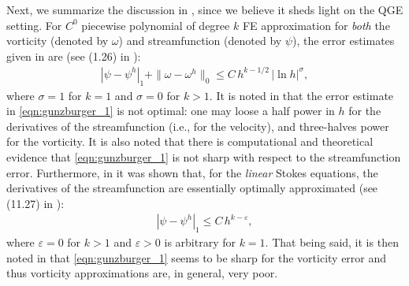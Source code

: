 Next, we summarize the discussion in \cite{Gunzburger89},
since we believe it sheds light on the QGE setting. For $C^0$ piecewise
polynomial of degree $k$ FE approximation for \emph{both} the vorticity
(denoted by $\omega$) and streamfunction (denoted by $\psi$), the error
estimates given in \cite{Girault86} are (see (1.26) in \cite{Gunzburger89}):
\begin{eqnarray}
  | \psi - \psi^h |_1 + \| \omega - \omega^h \|_0 \leq C \, h^{k - 1/2} \, | \ln h |^{\sigma} ,
  \label{eqn:gunzburger_1}
\end{eqnarray}
where $\sigma = 1$ for $k = 1$ and $\sigma = 0$ for $k > 1$. It is noted in
\cite{Gunzburger89} that the error estimate in \eqref{eqn:gunzburger_1} is not
optimal: one may loose a half power in $h$ for the derivatives of the
streamfunction (i.e., for the velocity), and three-halves power for the
vorticity. It is also noted that there is computational and theoretical evidence
that \eqref{eqn:gunzburger_1} is not sharp with respect to the streamfunction
error. Furthermore, in \cite{Fix84} it was shown that, for the \emph{linear}
Stokes equations, the derivatives of the streamfunction are essentially
optimally approximated (see (11.27) in \cite{Gunzburger89}):
\begin{eqnarray}
  | \psi - \psi^h |_1 \leq C \, h^{k - \varepsilon} , \label{eqn:gunzburger_2}
\end{eqnarray}
where $\varepsilon = 0$ for $k > 1$ and $\varepsilon > 0$ is arbitrary for $k =
1$. That being said, it is then noted in \cite{Gunzburger89} that
\eqref{eqn:gunzburger_1} seems to be sharp for the vorticity error and thus
vorticity approximations are, in general, very poor.
